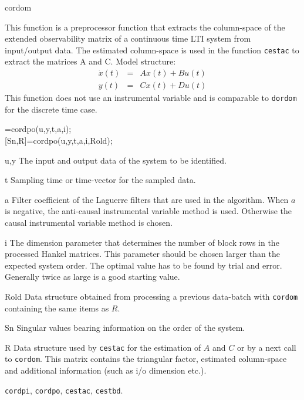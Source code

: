 \documentclass{book}
\newcommand{\dordom}{\texttt{dordom}}
\newcommand{\cordom}{\texttt{cordom}}
\newcommand{\cordpo}{\texttt{cordpo}}
\newcommand{\cordpi}{\texttt{cordpi}}
\newcommand{\cestac}{\texttt{cestac}}
\newcommand{\cestbd}{\texttt{cestbd}}
\begin{document}
\begin{command}{cordom}
  \begin{purpose}
    This function is a preprocessor function that extracts the
    column-space of the extended observability matrix of a continuous
    time LTI system from input/output data. The estimated column-space
    is used in the function {\cestac} to extract the matrices A and C.
    Model structure:
    \begin{eqnarray*}
      \dot{x}(t) &=&  A x(t) + B u(t)\\
      y(t) &=& C x(t) + Du(t)
    \end{eqnarray*}
    This function does not use an instrumental variable and is comparable
    to {\dordom} for the discrete time case.
  \end{purpose}
  
  \begin{syntax}
    [Sn,R]=cordpo(u,y,t,a,i);\\[0pt]
    [Sn,R]=cordpo(u,y,t,a,i,Rold);
  \end{syntax}

  \begin{inputs}
  \item[u,y] The input and output data of the system to be identified.
  \item[t] Sampling time or time-vector for the sampled data.
  \item[a] Filter coefficient of the Laguerre filters that are used in the
    algorithm. When $a$ is negative, the anti-causal instrumental variable
    method is used. Otherwise the causal instrumental variable method is
    chosen.
  \item[i] The dimension parameter that determines the number of block
    rows in the processed Hankel matrices. This parameter should be
    chosen larger than the expected system order. The optimal value has
    to be found by trial and error. Generally twice as large is a good
    starting value.
\item[Rold] Data structure obtained from processing a previous
  data-batch with {\cordom} containing the same items as $R$.
\end{inputs}

\begin{outputs}
\item[Sn] Singular values bearing information on the order of the  system.
\item[R] Data structure used by {\cestac} for the estimation of $A$
  and $C$ or by a next call to {\cordom}. This matrix contains the
  triangular factor, estimated column-space and additional information
  (such as i/o dimension etc.).
\end{outputs}
         
\begin{seealso}
  {\cordpi}, {\cordpo}, {\cestac}, {\cestbd}.
\end{seealso}
\end{command}%
\end{document}
